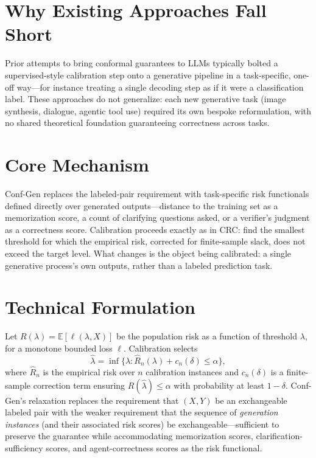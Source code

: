 \documentclass[10pt,twocolumn]{article}
\begin{document}
\section{Why Existing Approaches Fall Short}

Prior attempts to bring conformal guarantees to LLMs typically bolted a
supervised-style calibration step onto a generative pipeline in a
task-specific, one-off way---for instance treating a single decoding
step as if it were a classification label. These approaches do not
generalize: each new generative task (image synthesis, dialogue,
agentic tool use) required its own bespoke reformulation, with no
shared theoretical foundation guaranteeing correctness across tasks.

\section{Core Mechanism}

Conf-Gen replaces the labeled-pair requirement with task-specific risk
functionals defined directly over generated outputs---distance to the
training set as a memorization score, a count of clarifying questions
asked, or a verifier's judgment as a correctness score. Calibration
proceeds exactly as in CRC: find the smallest threshold for which the
empirical risk, corrected for finite-sample slack, does not exceed the
target level. What changes is the object being calibrated: a single
generative process's own outputs, rather than a labeled prediction
task.

\section{Technical Formulation}

Let $R(\lambda) = \mathbb{E}[\ell(\lambda, X)]$ be the population risk
as a function of threshold $\lambda$, for a monotone bounded loss
$\ell$. Calibration selects
\[
\hat\lambda = \inf\Big\{\lambda : \hat{R}_n(\lambda) + c_n(\delta)
  \le \alpha\Big\},
\]
where $\hat{R}_n$ is the empirical risk over $n$ calibration instances
and $c_n(\delta)$ is a finite-sample correction term ensuring
$R(\hat\lambda) \le \alpha$ with probability at least $1-\delta$.
Conf-Gen's relaxation replaces the requirement that $(X,Y)$ be an
exchangeable labeled pair with the weaker requirement that the sequence
of \emph{generation instances} (and their associated risk scores) be
exchangeable---sufficient to preserve the guarantee while accommodating
memorization scores, clarification-sufficiency scores, and
agent-correctness scores as the risk functional.
\end{document}
